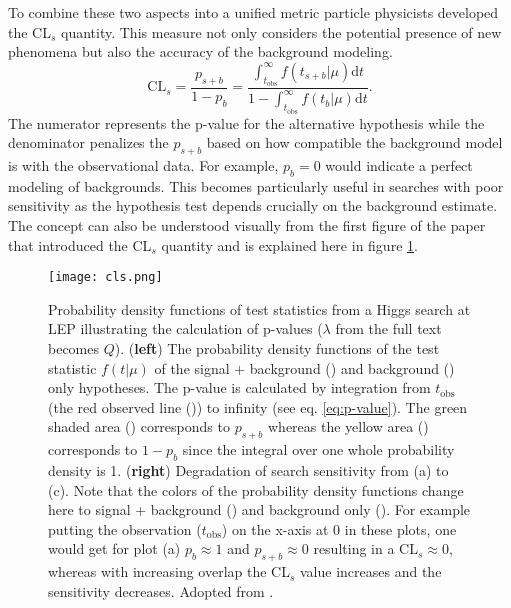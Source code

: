 To combine these two aspects into a unified metric particle physicists developed the CL$_s$ quantity. This measure not only considers the potential presence of new phenomena but also the accuracy of the background modeling.
\begin{equation}
    \mathrm{CL}_s=\frac{p_{s+b}}{1-p_{b}}=
    \frac
    {\int_{t_\text{obs}}^{\infty}
        f(t_{s+b} | \mu) \mathrm{d}t}
    {1-\int_{t_\text{obs}}^{\infty}
        f(t_{b} | \mu) \mathrm{d}t}.
\end{equation}
The numerator represents the p-value for the alternative hypothesis while the denominator penalizes the $p_{s+b}$ based on how compatible the background model is with the observational data. For example, $p_{b} = 0$ would indicate a perfect modeling of backgrounds. This becomes particularly useful in searches with poor sensitivity as the hypothesis test depends crucially on the background estimate. The concept can also be understood visually from the first figure of the paper that introduced the CL$_s$ quantity \citep{read2002presentation} and is explained here in figure \ref{fig:cls}.
\begin{figure}
    \centering
    \texttt{[image: cls.png]}
    \caption[]{Probability density functions of test statistics from a Higgs search at LEP illustrating the calculation of p-values ($\lambda$ from the full text becomes $Q$). (\textbf{left}) The probability density functions of the test statistic $f(t | \mu)$ of the signal + background ({\color[HTML]{804000}{$\bm{\diagup}$}}) and background ({\color[HTML]{2100FF}{$\bm{\diagup}$}}) only hypotheses. The p-value is calculated by integration from $t_\text{obs}$ (the red observed line ({\color[HTML]{FF0000}{$\bm{\diagup}$}})) to infinity (see eq. \ref{eq:p-value}). The green shaded area () corresponds to $p_{s+b}$ whereas the yellow area () corresponds to $1-p_b$ since the integral over one whole probability density is 1. (\textbf{right}) Degradation of search sensitivity from (a) to (c). Note that the colors of the probability density functions change here to signal + background () and background only (). For example putting the observation ($t_\text{obs}$) on the x-axis at 0 in these plots, one would get for plot (a) $p_{b}\approx 1$ and $p_{s+b}\approx 0$ resulting in a CL$_s\approx 0$, whereas with increasing overlap the CL$_s$ value increases and the sensitivity decreases. Adopted from \citep{read2002presentation}.}
    \label{fig:cls}
\end{figure}


